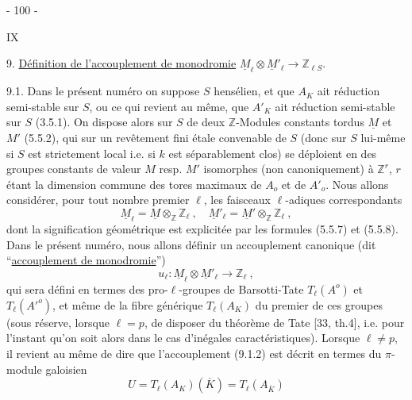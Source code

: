 \begin{center}- 100 -\end{center}\hfill IX

9. \uline{Définition de l'accouplement de monodromie} $\underline M_\ell\otimes\underline M'_\ell\longrightarrow\mathbb Z_{\ell S}$.

9.1. Dans le présent numéro on suppose $S$ hensélien, et que $A_K$ ait réduction semi-stable sur $S$, ou ce qui revient au même, que $A'_K$ ait réduction semi-stable sur $S$ (3.5.1). On dispose alors sur $S$ de deux $\mathbb Z$-Modules constants tordus $\underline M$ et $M'$ (5.5.2), qui sur un revêtement fini étale convenable de $S$ (donc sur $S$ lui-même si $S$ est strictement local i.e. si $k$ est séparablement clos) se déploient en des groupes constants de valeur $M$ resp. $M'$ isomorphes (non canoniquement) à $\mathbb Z^r$, $r$ étant la dimension commune des tores maximaux de $A_o$ et de $A'_o$. Nous allons considérer, pour tout nombre premier $\ell$, les faisceaux $\ell$-adiques correspondants
\[
\tag{9.1.1}\underline M_\ell=\underline M\otimes_{\mathbb Z}\mathbb Z_\ell\ ,\quad
\underline M'_\ell=\underline M'\otimes_{\mathbb Z}\mathbb Z_\ell\ ,
\]
dont la signification géométrique est explicitée par les formules (5.5.7) et (5.5.8). Dans le présent numéro, nous allons définir un accouplement canonique (dit ``\uline{accouplement de monodromie}'')
\[
\tag{9.1.2}u_\ell:\underline M_\ell\otimes\underline M'_\ell\longrightarrow\mathbb Z_\ell\ ,
\]
qui sera défini en termes des pro-$\ell$-groupes de Barsotti-Tate $T_\ell(A^o)$ et $T_\ell(A'^o)$, et même de la fibre générique $T_\ell(A_K)$ du premier de ces groupes (sous réserve, lorsque $\ell=p$, de disposer du théorème de Tate [33, th.4], i.e. pour l'instant qu'on soit alors dans le cas d'inégales caractéristiques). Lorsque $\ell\ne p$, il revient au même de dire que l'accouplement (9.1.2) est décrit en termes du $\pi$-module galoisien
\[
\tag{9.1.3}U=T_\ell(A_K)(\overline K)=T_\ell(A_{\overline K})
\]
